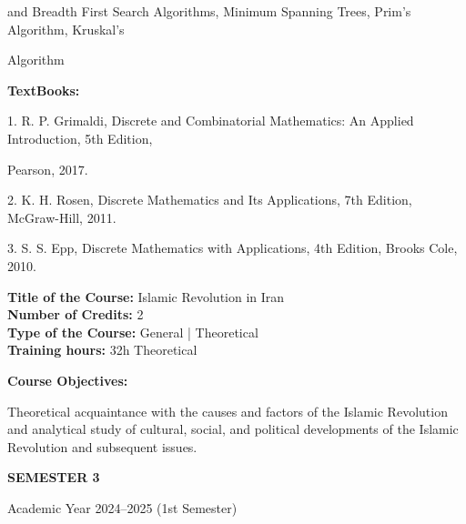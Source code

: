 \documentclass[12pt,a4paper]{article}
\begin{document}
and Breadth First Search Algorithms, Minimum Spanning Trees, Prim’s Algorithm, Kruskal’s\par
Algorithm\par\vspace{4pt}
\textbf{TextBooks:}\par\vspace{2pt}
1. R. P. Grimaldi, Discrete and Combinatorial Mathematics: An Applied Introduction, 5th Edition,\par
Pearson, 2017.\par
2. K. H. Rosen, Discrete Mathematics and Its Applications, 7th Edition, McGraw-Hill, 2011.\par
3. S. S. Epp, Discrete Mathematics with Applications, 4th Edition, Brooks Cole, 2010.\par
\vspace{4pt}

\newpage
\nopagebreak
\textbf{Title of the Course:} Islamic Revolution in Iran\\
\textbf{Number of Credits:} 2\\
\textbf{Type of the Course:} General | Theoretical\\
\textbf{Training hours:} 32h Theoretical\par\vspace{4pt}
\textbf{Course Objectives:}\par\vspace{2pt}
Theoretical acquaintance with the causes and factors of the Islamic Revolution and analytical study
of cultural, social, and political developments of the Islamic Revolution and subsequent issues.\par\vspace{4pt}

\newpage
\vspace*{\fill}
\begin{center}
  {\fontsize{28pt}{34pt}\selectfont \textbf{SEMESTER 3}}\par\vspace{12pt}
  {\fontsize{13pt}{17pt}\selectfont Academic Year 2024–2025 (1st Semester)}
\end{center}
\vspace*{\fill}
\end{document}
